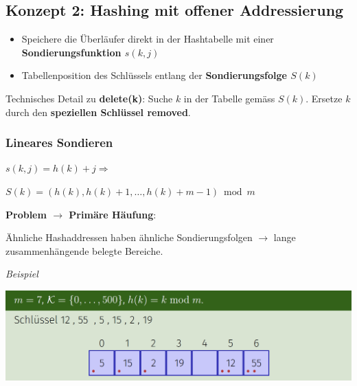 \vspace{-4pt}
\begin{sectionbox}
\subsection{Konzept 2: Hashing mit offener Addressierung}\par\smallskip
\begin{itemize}
    \item Speichere die Überläufer direkt in der Hashtabelle mit einer \textbf{Sondierungsfunktion $s(k,j)$}
    \item Tabellenposition des Schlüssels entlang der \textbf{Sondierungsfolge $S(k)$}
\end{itemize}\par\smallskip
Technisches Detail zu \textbf{delete(k)}: Suche $k$ in der Tabelle gemäss $S(k)$. Ersetze $k$ durch den \textbf{speziellen Schlüssel removed}.\par
\end{sectionbox}
\vspace{-4pt}
\begin{sectionbox}
\subsubsection{Lineares Sondieren}\par\smallskip
\begin{center}
    $s(k, j)=h(k)+j \Rightarrow$ \par $S(k)=(h(k), h(k)+1, \ldots, h(k)+m-1) \bmod m$
\end{center}\par\smallskip
\textbf{Problem $\rightarrow$ Primäre Häufung}:\par Ähnliche Hashaddressen haben ähnliche Sondierungsfolgen $\rightarrow$ lange zusammenhängende belegte Bereiche.\par\smallskip
\textit{Beispiel}\par
\begin{center}
    \includegraphics[width = 0.9\columnwidth]{../img/BspLinSond.png}
\end{center}
\end{sectionbox}
